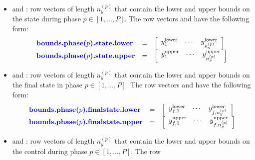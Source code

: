 \documentclass[10pt]{article}
\newcommand{\bfblue}[1]{\textrm{{\color{blue}{\bf #1}}}}
\begin{document}
\begin{itemize}
\begin{displaymath}
\begin{array}{lcl}
\end{array}
\end{displaymath}
\item \bfblue{bounds.phase($p$).state.lower} and \bfblue{bounds.phase($p$).state.upper}:
row vectors of length $n_y^{(p)}$ that contain the lower and upper
bounds on the state during phase $p\in[1,\ldots,P]$.  The row
vectors \bfblue{bounds.phase($p$).state.lower} and
\bfblue{bounds.phase($p$).state.upper} have the following form:
\begin{displaymath}
 \begin{array}{lcl}
   \bfblue{bounds.phase($p$).state.lower} & = &
  \left[\begin{array}{ccc} y_{1}^{\textrm{lower}} & \cdots & y_{n_y^{(p)}}^{\textrm{lower}}\end{array}\right] \\
   \bfblue{bounds.phase($p$).state.upper} & = &
  \left[\begin{array}{ccc} y_{1}^{\textrm{upper}} & \cdots & y_{n_y^{(p)}}^{\textrm{upper}}\end{array}\right]
\end{array}
\end{displaymath}
\item \bfblue{bounds.phase($p$).finalstate.lower} and \bfblue{bounds.phase($p$).finalstate.upper}:
row vectors of length $n_y^{(p)}$ that contain the lower and upper
bounds on the final state in phase $p\in[1,\ldots,P]$.  The row
vectors \bfblue{bounds.phase($p$).finalstate.lower} and
\bfblue{bounds.phase($p$).finalstate.upper} have the following form: 
\begin{displaymath}
 \begin{array}{lcl}
   \bfblue{bounds.phase($p$).finalstate.lower} & = &
  \left[\begin{array}{ccc} y_{f,1}^{\textrm{lower}} & \cdots & y_{f,n_y^{(p)}}^{\textrm{lower}}\end{array}\right] \\
   \bfblue{bounds.phase($p$).finalstate.upper} & = &
  \left[\begin{array}{ccc} y_{f,1}^{\textrm{upper}} & \cdots & y_{f,n_y^{(p)}}^{\textrm{upper}}\end{array}\right]
\end{array}
\end{displaymath}
\item \bfblue{bounds.phase($p$).control.lower} and \bfblue{bounds.phase($p$).control.upper}:
row vectors of length $n_y^{(p)}$ that contain the lower and upper
bounds on the control during phase $p\in[1,\ldots,P]$.  The row

\end{itemize}
\end{document}
